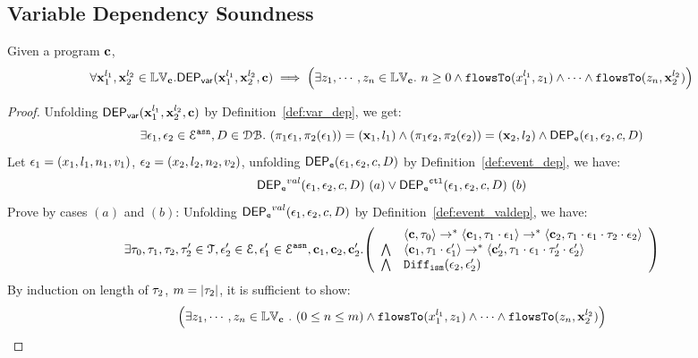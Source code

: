 
\clearpage
\subsection{Variable Dependency Soundness}
\begin{thm}
Given a program ${\boldsymbol{\mathbf{c}}}$, 
\[
  \forall {\boldsymbol{\mathbf{x}}}_1^{l_1}, {\boldsymbol{\mathbf{x}}}_2^{l_2} \in \mathbb{LV}_{{\boldsymbol{\mathbf{c}}}}.
  \mathsf{DEP_{var}}({\boldsymbol{\mathbf{x}}}_1^{l_1}, {\boldsymbol{\mathbf{x}}}_2^{l_2}, {\boldsymbol{\mathbf{c}}})
  \implies 
  \Big( \exists z_1, \cdots, z_n \in \mathbb{LV}_{{\boldsymbol{\mathbf{c}}}}. ~ n \geq 0 \land
  \mathtt{flowsTo}(x_1^{l_1}, z_1) 
  \land \cdots \land \mathtt{flowsTo}(z_n, {\boldsymbol{\mathbf{x}}}_2^{l_2}) \Big)
\]
\end{thm}
\begin{proof}
Unfolding $\mathsf{DEP_{var}}({\boldsymbol{\mathbf{x}}}_1^{l_1}, {\boldsymbol{\mathbf{x}}}_2^{l_2}, {\boldsymbol{\mathbf{c}}})$ by Definition~\ref{def:var_dep},
we get:
\[
\exists \mathtt{\epsilon}_1, \mathtt{\epsilon}_2 \in \mathcal{E}^{\mathtt{{asn}}}, D \in \mathcal{DB}. ~
(\pi_1{\mathtt{\epsilon}_1}, \pi_2(\mathtt{\epsilon}_1))= ({\boldsymbol{\mathbf{x}}}_1, l_1)
\land
(\pi_1{\mathtt{\epsilon}_2}, \pi_2(\mathtt{\epsilon}_2)) = ({\boldsymbol{\mathbf{x}}}_2, l_2)
\land 
\mathsf{DEP_{\mathtt{e}}}(\mathtt{\epsilon}_1, \mathtt{\epsilon}_2, c, D)
\]
%
Let $\mathtt{\epsilon}_1 = (x_1, l_1, n_1, v_1)$, $\mathtt{\epsilon}_2 = (x_2, l_2, n_2, v_2)$, unfolding $\mathsf{DEP_{\mathtt{e}}}(\mathtt{\epsilon}_1, \mathtt{\epsilon}_2, c, D)$ by Definition~\ref{def:event_dep}, we have:
\[
\mathsf{DEP_{\mathtt{e}}}^{val}(\mathtt{\epsilon}_1, \mathtt{\epsilon}_2, c, D) ~ (a) 
\lor
\mathsf{DEP_{\mathtt{e}}}^{\mathtt{{ctl}}}(\mathtt{\epsilon}_1, \mathtt{\epsilon}_2, c, D) ~ (b)
\]
Prove by cases $(a)$ and $(b)$:
%
%
Unfolding $\mathsf{DEP_{\mathtt{e}}}^{val}(\mathtt{\epsilon}_1, \mathtt{\epsilon}_2, c, D)$ by Definition~\ref{def:event_valdep}, we have:
\[
\exists \vtrace_0,
\vtrace_1, \vtrace_2, \vtrace_2' \in \mathcal{T}, \event_2' \in \eventset, \event_1' \in \eventset^{\asn}, \ssa{c}_1, \ssa{c}_2,  \ssa{c}_2'.
  \left(
  \begin{array}{ll}   
 & \config{\ssa{c}, \vtrace_0} \rightarrow^{*} 
\config{\ssa{c}_1, \vtrace_1 \cdot \event_1}  \rightarrow^{*} 
  \config{\ssa{c}_2,  \vtrace_1 \cdot \event_1 \cdot \vtrace_2 \cdot \event_2 } 
 \\ 
 \bigwedge &
  \config{\ssa{c}_1, \vtrace_1 \cdot \event_1'}  \rightarrow^{*} 
  \config{\ssa{c}_2',  \vtrace_1 \cdot \event_1  \cdot \vtrace_2' \cdot \event_2' } 
\\
\bigwedge & \ismdiff(\event_2,\event_2')
\end{array}
\right)
 \]
 By induction on length of $\mathtt{\tau}_2$, $m = |\mathtt{\tau}_2|$, it is sufficient to show:
%
 \[
 \Big(\exists z_1, \cdots, z_n \in \mathbb{LV}_{{\boldsymbol{\mathbf{c}}}} ~.~ (0 \leq n \leq m )
 \land \mathtt{flowsTo}(x_1^{l_1}, z_1) \land \cdots \land \mathtt{flowsTo}(z_n, {\boldsymbol{\mathbf{x}}}_2^{l_2}) \Big)
  \]

\end{proof}
